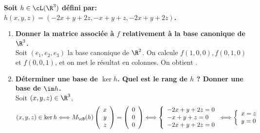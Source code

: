 \documentclass[a4paper, 11pt,reqno]{article}
\begin{document}
\begin{correction}  \;
	\textbf{Soit $h\in\cL(\R^3)$ d\'efini par: $h(x,y,z)= ( -2x+y+2z, -x+y+z, -2x+y+2z  )$.}
	\begin{enumerate}
		\item \textbf{Donner la matrice associ\'ee \`a $f$ relativement \`a la base canonique de $\R^3$. }\\
		      Soit $(e_1,e_2,e_3)$ la base canonique de $\R^2$. On calcule $f(1,0,0), f(0,1,0)$ et $f(0,0,1)$, et on met le r\'esultat en colonnes. On obtient .
		\item \textbf{D\'eterminer une base de $\ker h$. Quel est le rang de $h$ ? Donner une base de $\im h$.}\\
		      Soit $(x,y,z) \in \R^3$,
		      $$ (x,y,z) \in \ker h \Longleftrightarrow M_{\cB}(h) \left(\begin{array}{rrr} x \\ y \\ z \end{array} \right) =  \left(\begin{array}{r} 0 \\ 0 \\ 0 \end{array} \right)
			      \Longleftrightarrow
			      \left\{ \begin{array}{l}
				      -2x+y+2z = 0 \\
				      -x+y+z = 0   \\
				      -2x+y+2z = 0
			      \end{array}\right.
			      \Longleftrightarrow
			      \left\{ \begin{array}{l}
				      x=z   \\
				      y = 0 \\
			      \end{array}\right.$$

\end{enumerate}
\end{correction}
\end{document}
